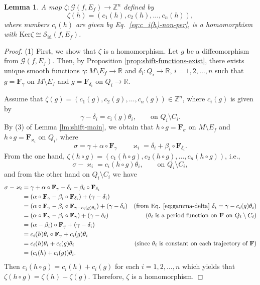 \documentclass[10pt,reqno]{amsart}
\newtheorem{lemma}[subsection]{Lemma}
\newcommand{\bbR}{\mathbb{R}}
\newcommand{\bbZ}{\mathbb{Z}}
\newcommand{\bfF}{\mathbf{F}}
\newcommand{\id}{\mathrm{id}}
\renewcommand{\ker}{\mathrm{Ker}}
\begin{document}
\begin{lemma}\label{lm:zeta-alpha-unique}
	 A map $\zeta:\mathcal{G}(f, E_f)\to \bbZ^n$ defined by
	\begin{equation}\label{eq:map-ZZZn}
		\zeta(h) = (c_1(h), c_2(h), \ldots, c_n(h)),
	\end{equation}
where numbers $c_i(h)$ are given by {\rm Eq.~\eqref{eq:c_i(h)-non-per}},
 is a homomorphism with $\ker\zeta \cong \mathcal{S}_{\id}(f, E_f)$. 
\end{lemma}
\begin{proof}
	(1) First, we show that $\zeta$ is a homomorphism.
	Let $g$ be a diffeomorphism from $\mathcal{G}(f, E_f)$. Then, by Proposition  \ref{prop:shift-functions-exist}, there exists unique smooth functions $\gamma:M\setminus E_f\to \bbR$ and $\delta_i:Q_i\to \bbR$, $i=1,2,\ldots, n$ such that $g = \bfF_{\gamma}$ on $M\setminus E_f$ and $g = \bfF_{\delta_i}$ on $Q_i\to \bbR$.
	
	Assume that $\zeta(g) = (c_1(g), c_2(g), \ldots, c_n(g))\in\bbZ^n$,  where $c_i(g)$ is given by
	\begin{equation}\label{eq:gamma-delta}
		\gamma-\delta_i = c_i(g)\theta_i, \qquad \text{on }Q_i\setminus C_i.
	\end{equation}
	By (3) of Lemma \ref{lm:shift-main}, we obtain that $h\circ g = \bfF_{\sigma}$ on $M\setminus E_f$ and $h\circ g = \bfF_{\varkappa_i}$ on $Q_i$, where 
	$$
	\sigma = \gamma+\alpha\circ \bfF_{\gamma}\qquad \varkappa_i =\delta_i+ \beta_i\circ \bfF_{\delta_i}.
	$$
	 From the one hand,  $\zeta(h\circ g) = (c_1(h\circ g), c_2(h\circ g),\ldots,  c_n(h\circ g))$, i.e.,
	 \begin{equation}\label{eq:zeta-gen}
	 \sigma-\varkappa_i = c_i(h\circ g)\theta_i,\qquad\text{on }Q_i\setminus C_i,
	 \end{equation}
	and from the other hand on $Q_i\setminus C_i$ we have
	\begin{align*}
	\sigma-\varkappa_i &=\gamma+\alpha\circ \bfF_{\gamma}-\delta_i-\beta_i\circ \bfF_{\delta_i} \\
	&=  (\alpha\circ \bfF_{\gamma}-\beta_i\circ \bfF_{\delta_i}) +(\gamma-\delta_i ) & \\
	&=  (\alpha\circ \bfF_{\gamma}-\beta_i\circ \bfF_{\gamma-c_i(g)\theta_i}) + (\gamma-\delta_i )
	& (\text{from Eq. \eqref{eq:gamma-delta} }\delta_i = \gamma-c_i(g)\theta_i)\\
	&= ( \alpha\circ \bfF_{\gamma} - \beta_i\circ \bfF_{\gamma}) +(\gamma-\delta_i ) & (\text{$\theta_i$ is a period function on $\bfF$ on $Q_i\setminus C_i$} )\\
	&=  (\alpha-\beta_i)\circ \bfF_{\gamma} +(\gamma-\delta_i ) \\
	&= c_i(h)\theta_i\circ \bfF_{\gamma} +c_i(g)\theta_i \\
	&=c_i(h)\theta_i +c_i(g)\theta_i & (\text{since $\theta_i$ is constant on each trajectory of $\bfF$}) \\
	&= (c_i(h)+c_i(g))\theta_i.
	\end{align*}
	Then $c_i(h\circ g) = c_i(h)+c_i(g)$ for each $i = 1,2,\ldots, n$ which yields that $\zeta(h\circ g) = \zeta(h)+\zeta(g)$. Therefore,  $\zeta$ is a homomorphism.
	

\end{proof}
\end{document}
